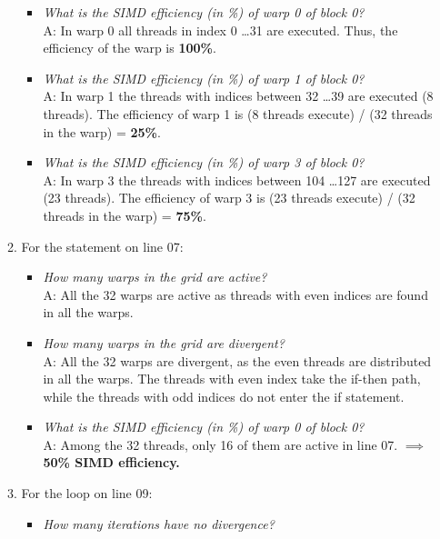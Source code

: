 \begin{enumerate}
\begin{enumerate}
\begin{itemize}
                        \item \textsl{What is the SIMD efficiency (in \%) of warp 0 of block 0?}
                              \\A: In warp 0 all threads in index 0 \dots 31 are executed. Thus, the efficiency of the warp is \textbf{100\%}.
                        \item \textsl{What is the SIMD efficiency (in \%) of warp 1 of block 0?}
                              \\A: In warp 1 the threads with indices between 32 \dots 39 are executed (8 threads). The efficiency of warp 1 is (8 threads execute) / (32 threads in the warp) = \textbf{25\%}.
                        \item \textsl{What is the SIMD efficiency (in \%) of warp 3 of block 0?}
                              \\A: In warp 3 the threads with indices between 104 \dots 127 are executed (23 threads). The efficiency of warp 3 is (23 threads execute) / (32 threads in the warp) = \textbf{75\%}.
                    \end{itemize}
              \item For the statement on line 07:
                    \begin{itemize}
                        \item \textsl{How many warps in the grid are active?}
                              \\A: All the 32 warps are active as threads with even indices are found in all the warps.
                        \item \textsl{How many warps in the grid are divergent?}
                              \\A: All the 32 warps are divergent, as the even threads are distributed in all the warps. The threads with even index take the if-then path, while the threads with odd indices do not enter the if statement.
                        \item \textsl{What is the SIMD efficiency (in \%) of warp 0 of block 0?}
                              \\A: Among the 32 threads, only 16 of them are active in line 07. $\implies$ \textbf{50\% SIMD efficiency.}
                    \end{itemize}
              \item For the loop on line 09:
                    \begin{itemize}
                        \item \textsl{How many iterations have no divergence?}

\end{itemize}
\end{enumerate}
\end{enumerate}
